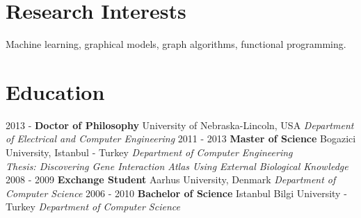 \documentclass[showupdate]{xqcv}
\begin{document}


\address{1432 B St Apt 2\\
         Lincoln, Nebraska 68502, USA
       }
\headerboxheight{6cm} %


\maketitle

\section{Research Interests}
Machine learning, graphical models, graph algorithms, functional programming.

\section{Education}
\begin{entrylist}
  \entry
  {2013 -}
  {\textbf{Doctor of Philosophy}}
  {University of Nebraska-Lincoln, USA}
  {
    \textit{Department of Electrical and Computer Engineering}
  }
  \entry
  {2011 - 2013}
  {\textbf{Master of Science}}
  {Bogazici University, Istanbul - Turkey}
  {
   \textit{Department of Computer Engineering} \\
   \textit{\footnotesize{Thesis: Discovering Gene Interaction Atlas Using External Biological Knowledge}}
   }
   \entry
   {2008 - 2009}
   {\textbf{Exchange Student}}
   {Aarhus University, Denmark}
   {
    \textit{Department of Computer Science}
   }
  \entry
  {2006 - 2010}
  {\textbf{Bachelor of Science}}
  {Istanbul Bilgi University - Turkey}
  {\textit{Department of Computer Science}}
\end{entrylist}
\end{document}
